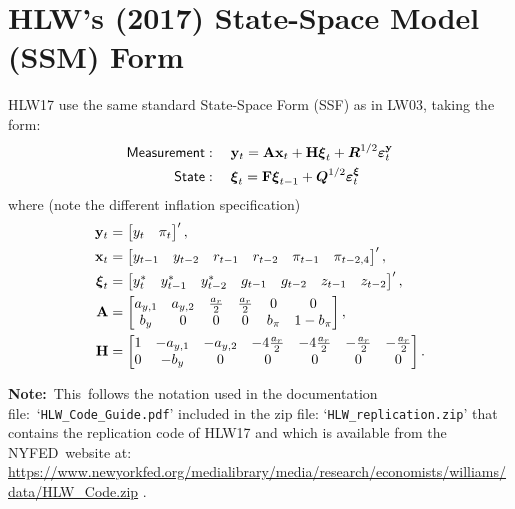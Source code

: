 \documentclass[a4paper,12pt]{article}
\begin{document}
\section{HLW's (2017) State-Space Model (SSM) Form}

HLW17 use the same standard State-Space Form (SSF) as in LW03, taking the
form:%
\begin{align*}
\mathsf{Measurement}& :\quad \mathbf{y}_{t}=\mathbf{Ax}_{t}+\mathbf{H}%
\boldsymbol{\xi }_{t}+\boldsymbol{R}^{1/2}\boldsymbol{\varepsilon }_{t}^{%
\mathbf{y}} \\
\mathsf{State}& :\quad \boldsymbol{\xi }_{t}=\mathbf{F}\boldsymbol{\xi }%
_{t-1}+\boldsymbol{Q}^{1/2}\boldsymbol{\varepsilon }_{t}^{\boldsymbol{\xi }}
\end{align*}%
where (note the different inflation specification)%
\begin{align*}
\mathbf{y}_{t}& =%
\begin{bmatrix}
y_{t} & \pi _{t}%
\end{bmatrix}%
^{\prime }, \\
\mathbf{x}_{t}& =%
\begin{bmatrix}
y_{t-1} & y_{t-2} & r_{t-1} & r_{t-2} & \pi _{t-1} & \pi _{t-2,4}%
\end{bmatrix}%
^{\prime }, \\
\boldsymbol{\xi }_{t}& =%
\begin{bmatrix}
y_{t}^{\ast } & y_{t-1}^{\ast } & y_{t-2}^{\ast } & g_{t-1} & g_{t-2} & 
z_{t-1} & z_{t-2}%
\end{bmatrix}%
^{\prime }, \\
\mathbf{A}& =%
\begin{bmatrix}
a_{y,1} & a_{y,2} & \frac{a_{r}}{2} & \frac{a_{r}}{2} & 0 & 0 \\ 
b_{y} & 0 & 0 & 0 & b_{\pi } & 1-b_{\pi }%
\end{bmatrix}%
, \\
\mathbf{H}& =%
\begin{bmatrix}
1 & -a_{y,1} & -a_{y,2} & -4\frac{a_{r}}{2} & -4\frac{a_{r}}{2} & -\frac{%
a_{r}}{2} & -\frac{a_{r}}{2} \\ 
0 & -b_{y} & 0 & 0 & 0 & 0 & 0%
\end{bmatrix}%
.
\end{align*}

\noindent \textbf{Note:}\ This\ follows the notation used in the
documentation file:\ `\texttt{HLW\_Code\_Guide.pdf}' included in the zip
file: `\texttt{HLW\_replication.zip}' that contains the replication code of
HLW17 and which is available from the NYFED\ website at: %
\url{https://www.newyorkfed.org/medialibrary/media/research/economists/williams/data/HLW_Code.zip}%
.
\end{document}
